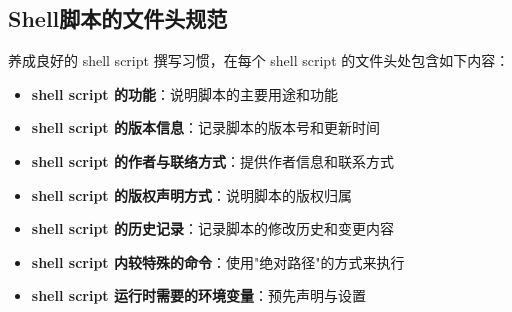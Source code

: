 \documentclass[12pt,UTF8]{ctexbook}
\begin{document}
\subsection{Shell脚本的文件头规范}
养成良好的 shell script 撰写习惯，在每个 shell script 的文件头处包含如下内容：

\begin{itemize}
    \item \textbf{shell script 的功能}：说明脚本的主要用途和功能
    \item \textbf{shell script 的版本信息}：记录脚本的版本号和更新时间
    \item \textbf{shell script 的作者与联络方式}：提供作者信息和联系方式
    \item \textbf{shell script 的版权声明方式}：说明脚本的版权归属
    \item \textbf{shell script 的历史记录}：记录脚本的修改历史和变更内容
    \item \textbf{shell script 内较特殊的命令}：使用"绝对路径"的方式来执行
    \item \textbf{shell script 运行时需要的环境变量}：预先声明与设置
\end{itemize}
\end{document}
